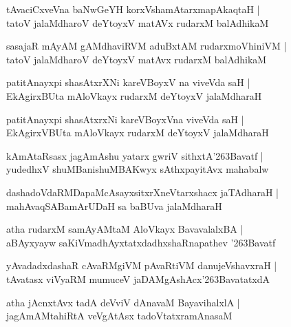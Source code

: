 \documentclass[twoside,12pt,openright]{book}
\def\S{\char'263}
\newcounter{shloka}[chapter]
\begin{document}
\begin{shloka}%
tAvaciCxveVna baNwGeYH korxVshamAtarxmapAkaqtaH |\\
tatoV jalaMdharoV deYtoyxV matAVx rudarxM balAdhikaM 
\end{shloka}

\begin{shloka}%
sasajaR mAyAM gAMdhaviRVM aduBxtAM rudarxmoVhiniVM |\\
tatoV jalaMdharoV deYtoyxV matAvx rudarxM balAdhikaM 
\end{shloka}

\begin{shloka}%
patitAnayxpi shasAtxrXNi kareVBoyxV na viveVda saH |\\
EkAgirxBUta mAloVkayx rudarxM deYtoyxV jalaMdharaH
\end{shloka}

\begin{shloka}%
patitAnayxpi shasAtxrxNi kareVBoyxVna viveVda saH |\\
EkAgirxVBUta mAloVkayx rudarxM deYtoyxV jalaMdharaH
\end{shloka}

\begin{shloka}%
kAmAtaRsasx jagAmAshu yatarx gwriV sithxtA\S Bavatf |\\
yudedhxV shuMBanishuMBAKwyx sAthxpayitAvx mahabalw  
\end{shloka}

\begin{shloka}%
dashadoVdaRMDapaMcAsayxsitxrXneVtarxshacx jaTAdharaH |\\
mahAvaqSABamArUDaH sa baBUva jalaMdharaH 
\end{shloka}

\begin{shloka}%
atha rudarxM samAyAMtaM AloVkayx BavavalalxBA |\\
aBAyxyayw saKiVmadhAyxtatxdadhxshaRnapathev \S Bavatf 
\end{shloka}

\begin{shloka}%
yAvadadxdashaR cAvaRMgiVM pAvaRtiVM danujeVshavxraH |\\
tAvatasx viVyaRM mumuceV jaDAMgAshAcx\S BavatatxdA 
\end{shloka}

\begin{shloka}%
atha jAcnxtAvx tadA deVviV dAnavaM BayavihalxlA |\\
jagAmAMtahiRtA veVgAtAsx tadoVtatxramAnasaM 
\end{shloka}
\end{document}
